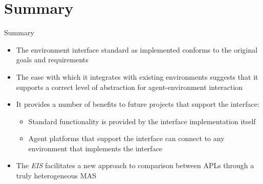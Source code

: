 \documentclass[t]{beamer}
\begin{document}
\section{Summary}
\begin{frame}{Summary}
	\begin{itemize}[<+->]
		\item The environment interface standard as implemented conforms to the original goals and requirements
		\item The ease with which it integrates with existing environments suggests that it supports a correct level of abstraction for agent-environment interaction
		\item It provides a number of benefits to future projects that support the interface:
		\begin{itemize}
			\item Standard functionality is provided by the interface implementation itself
			\item Agent platforms that support the interface can connect to any environment that implements the interface
		\end{itemize}
		\item The \emph{EIS} facilitates a new approach to comparison between APLs through a truly heterogeneous MAS
	\end{itemize}
\end{frame}
\end{document}
